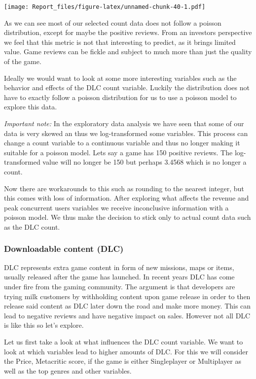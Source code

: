 \documentclass[
]{article}
\begin{document}
\texttt{[image: Report\_files/figure-latex/unnamed-chunk-40-1.pdf]}

As we can see most of our selected count data does not follow a poisson
distribution, except for maybe the positive reviews. From an investors
perspective we feel that this metric is not that interesting to predict,
as it brings limited value. Game reviews can be fickle and subject to
much more than just the quality of the game.

Ideally we would want to look at some more interesting variables such as
the behavior and effects of the DLC count variable. Luckily the
distribution does not have to exactly follow a poisson distribution for
us to use a poisson model to explore this data.

\emph{Important note:} In the exploratory data analysis we have seen
that some of our data is very skewed an thus we log-transformed some
variables. This process can change a count variable to a continuous
variable and thus no longer making it suitable for a poisson model. Lets
say a game has 150 positive reviews. The log-transformed value will no
longer be 150 but perhaps 3.4568 which is no longer a count.

Now there are workarounds to this such as rounding to the nearest
integer, but this comes with loss of information. After exploring what
affects the revenue and peak concurrent users variables we receive
inconclusive information with a poisson model. We thus make the decision
to stick only to actual count data such as the DLC count.

\hypertarget{downloadable-content-dlc}{%
\subsubsection{Downloadable content
(DLC)}\label{downloadable-content-dlc}}

DLC represents extra game content in form of new missions, maps or
items, usually released after the game has launched. In recent years DLC
has come under fire from the gaming community. The argument is that
developers are trying milk customers by withholding content upon game
release in order to then release said content as DLC later down the road
and make more money. This can lead to negative reviews and have negative
impact on sales. However not all DLC is like this so let's explore.

Let us first take a look at what influences the DLC count variable. We
want to look at which variables lead to higher amounts of DLC. For this
we will consider the Price, Metacritic score, if the game is either
Singleplayer or Multiplayer as well as the top genres and other
variables.
\end{document}
